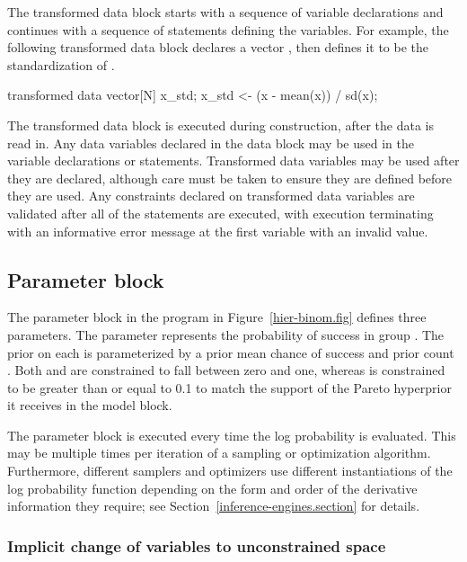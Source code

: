\documentclass[article]{jss}
\begin{document}
The transformed data block starts with a sequence of variable
declarations and continues with a sequence of statements defining the
variables.  For example, the following transformed data block declares
a vector , then defines it to be the standardization of .
%
\begin{Code}
transformed data {
  vector[N] x_std;
  x_std <- (x - mean(x)) / sd(x);
}
\end{Code}

The transformed data block is executed during construction, after the
data is read in.  Any data variables declared in the data block may be
used in the variable declarations or statements.  Transformed data
variables may be used after they are declared, although care must be
taken to ensure they are defined before they are used.  Any
constraints declared on transformed data variables are validated after
all of the statements are executed, with execution terminating with an
informative error message at the first variable with an invalid value.

\subsection{Parameter block}

The parameter block in the program in Figure~\ref{hier-binom.fig}
defines three parameters.  The parameter  represents
the probability of success in group .  The prior on each
 is parameterized by a prior mean chance of success
 and prior count .  Both  and
 are constrained to fall between zero and one, whereas
 is constrained to be greater than or equal to 0.1 to
match the support of the Pareto hyperprior it receives in the model block.

The parameter block is executed every time the log probability is
evaluated.  This may be multiple times per iteration of a sampling or
optimization algorithm.  Furthermore, different samplers and
optimizers use different instantiations of the log probability
function depending on the form and order of the derivative information
they require; see Section~\ref{inference-engines.section} for
details. 

\subsubsection{Implicit change of variables to unconstrained space}
\end{document}
